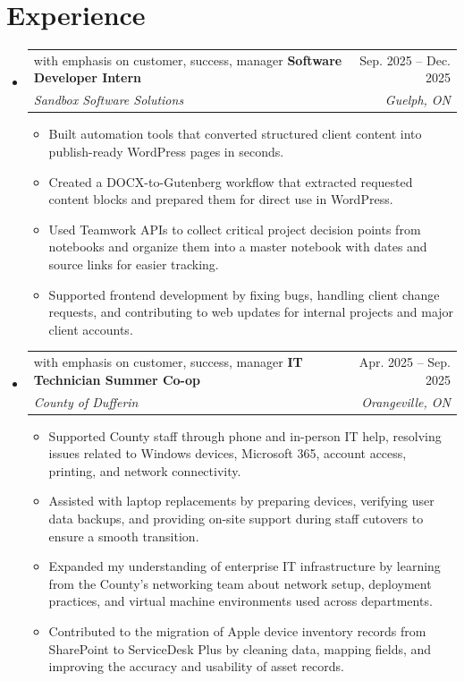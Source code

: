 \documentclass[letterpaper,11pt]{article}
\makeatletter
\newcommand{\resumeItem}[1]{
  \item\small{
    {#1 \vspace{-2pt}}
  }
}
\newcommand{\resumeSubheading}[4]{
  \vspace{-2pt}\item
    \begin{tabular*}{0.97\textwidth}[t]{l@{\extracolsep{\fill}}r}
 with emphasis on customer, success, manager
      \textbf{#1} & #2 \\
      \textit{\small#3} & \textit{\small #4} \\
    \end{tabular*}\vspace{-7pt}
}
\newcommand{\resumeSubSubheading}[2]{
    \item
    \begin{tabular*}{0.97\textwidth}{l@{\extracolsep{\fill}}r}
      \textit{\small#1} & \textit{\small #2} \\
    \end{tabular*}\vspace{-7pt}
}
\newcommand{\resumeSubHeadingListStart}{\begin{itemize}[leftmargin=0.15in, label={}]}
\newcommand{\resumeSubHeadingListEnd}{\end{itemize}}
\newcommand{\resumeItemListStart}{\begin{itemize}}
\newcommand{\resumeItemListEnd}{\end{itemize}\vspace{-5pt}}
\makeatother
\begin{document}
\section{Experience}
  \resumeSubHeadingListStart

          


\resumeSubheading
  {Software Developer Intern}{Sep. 2025 -- Dec. 2025}
  {Sandbox Software Solutions}{Guelph, ON}
  \resumeItemListStart
    \resumeItem{Built automation tools that converted structured client content into publish-ready WordPress pages in seconds.}
    \resumeItem{Created a DOCX-to-Gutenberg workflow that extracted requested content blocks and prepared them for direct use in WordPress.}
    \resumeItem{Used Teamwork APIs to collect critical project decision points from notebooks and organize them into a master notebook with dates and source links for easier tracking.}
    \resumeItem{Supported frontend development by fixing bugs, handling client change requests, and contributing to web updates for internal projects and major client accounts.}
  \resumeItemListEnd
    
    \resumeSubheading
  {IT Technician Summer Co-op}{Apr. 2025 -- Sep. 2025}
  {County of Dufferin}{Orangeville, ON}
  \resumeItemListStart
    \resumeItem{Supported County staff through phone and in-person IT help, resolving issues related to Windows devices, Microsoft 365, account access, printing, and network connectivity.}
    \resumeItem{Assisted with laptop replacements by preparing devices, verifying user data backups, and providing on-site support during staff cutovers to ensure a smooth transition.}
    \resumeItem{Expanded my understanding of enterprise IT infrastructure by learning from the County’s networking team about network setup, deployment practices, and virtual machine environments used across departments.}
    \resumeItem{Contributed to the migration of Apple device inventory records from SharePoint to ServiceDesk Plus by cleaning data, mapping fields, and improving the accuracy and usability of asset records.}
  \resumeItemListEnd

  \resumeSubHeadingListEnd
\end{document}
